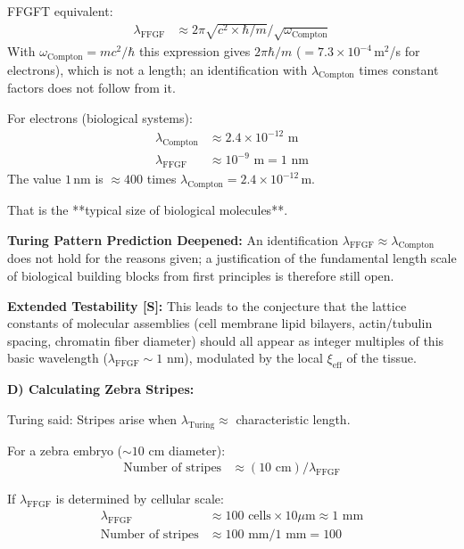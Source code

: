 	FFGFT equivalent:
	\begin{align*}
		\lambda_{\text{FFGF}} &\approx 2\pi \sqrt{c^2 \times \hbar/m} / \sqrt{\omega_{\text{Compton}}}
	\end{align*}
	With $\omega_{\text{Compton}} = mc^2/\hbar$ this expression gives $2\pi\hbar/m$ ($= 7.3\times10^{-4}$\,m$^2$/s for electrons), which is not a length; an identification with $\lambda_{\text{Compton}}$ times constant factors does not follow from it.
	
	For electrons (biological systems):
	\begin{align*}
		\lambda_{\text{Compton}} &\approx 2.4 \times 10^{-12} \text{ m} \\
		\lambda_{\text{FFGF}} &\approx 10^{-9} \text{ m} = 1 \text{ nm}
	\end{align*}
	The value $1$\,nm is $\approx 400$ times $\lambda_{\text{Compton}} = 2.4\times10^{-12}$\,m.
	
	That is the **typical size of biological molecules**.
	
	\textbf{Turing Pattern Prediction Deepened:}
	An identification $\lambda_{\text{FFGF}} \approx \lambda_{\text{Compton}}$ does not hold for the reasons given; a justification of the fundamental length scale of biological building blocks from first principles is therefore still open.
	
	\textbf{Extended Testability [S]:} This leads to the conjecture that the lattice constants of molecular assemblies (cell membrane lipid bilayers, actin/tubulin spacing, chromatin fiber diameter) should all appear as integer multiples of this basic wavelength ($\lambda_{\text{FFGF}} \sim 1$ nm), modulated by the local $\xi_{\text{eff}}$ of the tissue.
	
	\textbf{D) Calculating Zebra Stripes:}
	
	Turing said: Stripes arise when $\lambda_{\text{Turing}} \approx$ characteristic length.
	
	For a zebra embryo ($\sim 10$ cm diameter):
	\begin{align*}
		\text{Number of stripes} &\approx (10 \text{ cm}) / \lambda_{\text{FFGF}}
	\end{align*}
	
	If $\lambda_{\text{FFGF}}$ is determined by cellular scale:
	\begin{align*}
		\lambda_{\text{FFGF}} &\approx 100 \text{ cells} \times 10 \mu\text{m} \approx 1 \text{ mm} \\
		\text{Number of stripes} &\approx 100 \text{ mm} / 1 \text{ mm} = 100
	\end{align*}
	
